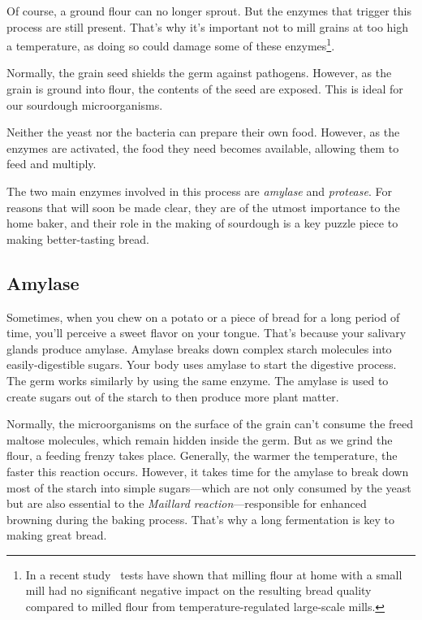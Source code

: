 Of course, a ground flour can no longer sprout. But the enzymes that
trigger this process are still present. That's why it's important not to
mill grains at too high a temperature, as doing so could damage some of
these enzymes\footnote{In a recent 
study~\cite{milling+commercial+home+mill+comparison} tests have shown that
milling flour
at home with a small mill had no significant negative impact on the resulting
bread quality compared to milled flour from temperature-regulated large-scale
mills.}.

Normally, the grain seed shields the germ against pathogens. However, as the
grain is ground into flour, the contents of the seed are exposed. This is ideal
for our sourdough microorganisms.

Neither the yeast nor the bacteria can prepare their own food. However, as
the enzymes are activated, the food they need becomes available, allowing them
to feed and multiply.

The two main enzymes involved in this process are \emph{amylase} and
\emph{protease}. For reasons that will soon be made clear, they are of the
utmost importance to the home baker, and their role in the making of sourdough
is a key puzzle piece to making better-tasting bread.

\subsection{Amylase}

Sometimes, when you chew on a potato or a piece of bread for a long period
of time, you'll perceive a sweet flavor on your tongue. That's because your
salivary glands produce amylase. Amylase breaks down complex starch molecules
into easily-digestible sugars. Your body uses amylase to start the digestive
process. The germ works similarly by using the same enzyme. The amylase
is used to create sugars out of the starch to then produce more plant matter.

Normally,
the microorganisms on the surface of the grain can't consume the freed maltose
molecules, which remain hidden inside the germ. But as we grind the flour, a
feeding frenzy takes place.  Generally, the warmer the temperature, the faster
this reaction occurs. However, it takes time for the amylase
to break down most of the starch into simple sugars---which are not only
consumed by the yeast but are also
essential to the \emph{Maillard reaction}---responsible for
enhanced browning during the baking process.
That's why a long fermentation is key to making great bread.

